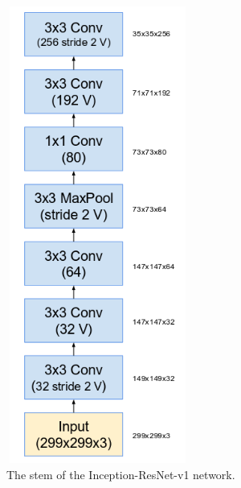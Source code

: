 \documentclass[a4paper,12pt, twoside]{NITKReport}
\begin{document}
\begin{figure}
\centering
\begin{minipage}[b]{0.4\textwidth}
   \includegraphics[height=15cm,width=6cm]{figure14.png}
    \caption{The stem of the Inception-ResNet-v1 network.~\cite{szegedy2017inception}}
    \label{14}
  \end{minipage}
  \hfill
  \begin{minipage}[b]{0.4\textwidth}

\end{minipage}
\end{figure}
\end{document}

